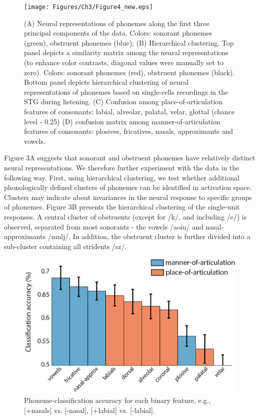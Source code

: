\begin{figure}[H]
\vspace{.3in}
\texttt{[image: Figures/Ch3/Figure4\_new.eps]}
\caption{(A) Neural representations of phonemes along the first three principal components of the data. Colors: sonorant phonemes (green), obstruent phonemes (blue); (B) Hierarchical clustering. Top panel depicts a similarity matrix among the neural representations (to enhance color contrasts, diagonal values were manually set to zero). Colors: sonorant phonemes (red), obstruent phonemes (black). Bottom panel depicts hierarchical clustering of neural representations of phonemes based on single-cells recordings in the STG during listening. (C) Confusion among place-of-articulation features of consonants: labial, alveolar, palatal, velar, glottal (chance level - 0.25) (D) confusion matrix among manner-of-articulation features of consonants: plosives, fricatives, nasals, approximants and vowels.}
\end{figure}

Figure 3A suggests that sonorant and obstruent phonemes have relatively distinct neural representations. We therefore further experiment with the data in the following way. First, using hierarchical clustering, we test whether additional phonologically defined clusters of phonemes can be identified in activation space. Clusters may indicate about invariances in the neural response to specific groups of phonemes. Figure 3B presents the hierarchical clustering of the single-unit responses. A central cluster of obstruents (except for /k/, and including /e/) is observed, separated from most sonorants - the vowels /aoiu/ and nasal-approximants /nmlj/. In addition, the obstruent cluster is further divided into a sub-cluster containing all stridents /sz/. 

\begin{figure}[H]
\vspace{.3in}
\includegraphics[width=\linewidth]{Figures/Ch3/Figure5_new.eps}
\caption{Phoneme-classification accuracy for each binary feature, e.g., [+nasals] vs. [-nasal], [+labial] vs. [-labial].}
\end{figure}

